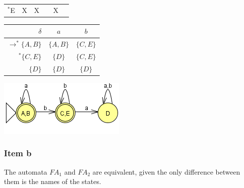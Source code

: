 \documentclass[docid=TP07]{tcom_TP}
\begin{document}
{\begin{center}
\begin{tabular}{r || c | c | c | c | c}
	$^*$E  & X  & X  &    & X  & \cellcolor{gray}
\end{tabular} \end{center}
\begin{center}
\begin{minipage}[c]{0.40\textwidth}
\begin{center} \begin{tabular}{r | c c}
	$\delta                $ & $a      $ & $b      $ \\ \hline
	$\rightarrow ^* \{A,B\}$ & $\{A,B\}$ & $\{C,E\}$ \\
	$            ^* \{C,E\}$ & $\{D  \}$ & $\{C,E\}$ \\
	$               \{D  \}$ & $\{D  \}$ & $\{D  \}$
\end{tabular} \end{center}
\end{minipage}%
\begin{minipage}[c]{0.35\textwidth}
\begin{center} \includegraphics[scale=0.5]{TP07_6a} \end{center}
\end{minipage}
\end{center}
\subsubsection{Item b}
The automata $FA_1$ and $FA_2$ are equivalent, given the only difference between them is the names of the states.
}
\end{document}

